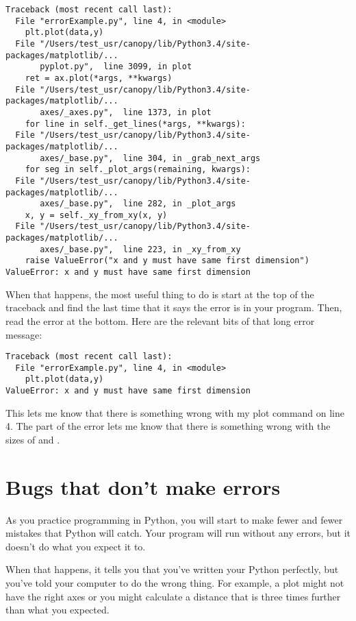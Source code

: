 \begin{Verbatim}
Traceback (most recent call last):
  File "errorExample.py", line 4, in <module>
    plt.plot(data,y)
  File "/Users/test_usr/canopy/lib/Python3.4/site-packages/matplotlib/...
       pyplot.py",  line 3099, in plot
    ret = ax.plot(*args, **kwargs)
  File "/Users/test_usr/canopy/lib/Python3.4/site-packages/matplotlib/...
       axes/_axes.py",  line 1373, in plot
    for line in self._get_lines(*args, **kwargs):
  File "/Users/test_usr/canopy/lib/Python3.4/site-packages/matplotlib/...
       axes/_base.py",  line 304, in _grab_next_args
    for seg in self._plot_args(remaining, kwargs):
  File "/Users/test_usr/canopy/lib/Python3.4/site-packages/matplotlib/...
       axes/_base.py",  line 282, in _plot_args
    x, y = self._xy_from_xy(x, y)
  File "/Users/test_usr/canopy/lib/Python3.4/site-packages/matplotlib/...
       axes/_base.py",  line 223, in _xy_from_xy
    raise ValueError("x and y must have same first dimension")
ValueError: x and y must have same first dimension
\end{Verbatim}

When that happens, the most useful thing to do is start at the top of the traceback and find the last time that it says the error is in your program.  Then, read the error at the bottom.  Here are the relevant bits of that long error message:

\begin{Verbatim}
Traceback (most recent call last):
  File "errorExample.py", line 4, in <module>
    plt.plot(data,y)
ValueError: x and y must have same first dimension
\end{Verbatim}
This lets me know that there is something wrong with my plot command on line 4. The  part of the error lets me know that there is something wrong with the sizes of  and .

\section{Bugs that don't make errors}
As you practice programming in Python, you will start to make fewer and fewer mistakes that Python will catch.  Your program will run without any errors, but it doesn't do what you expect it to.

When that happens, it tells you that you've written your Python perfectly, but you've told your computer to do the wrong thing.  For example, a plot might not have the right axes or
you might calculate a distance that is three times further than what you expected.

